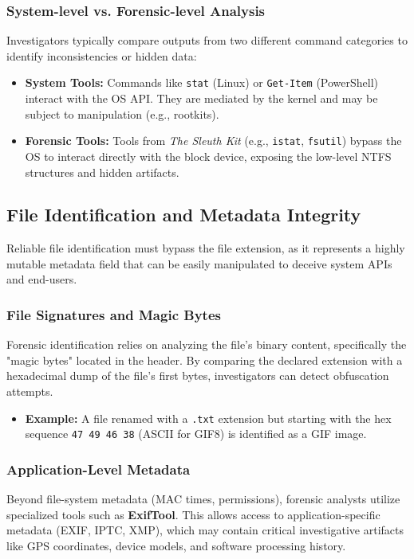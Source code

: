 \subsubsection*{System-level vs. Forensic-level Analysis}
Investigators typically compare outputs from two different command categories to identify inconsistencies or hidden data:
\begin{itemize}
    \item \textbf{System Tools:} Commands like \texttt{stat} (Linux) or \texttt{Get-Item} (PowerShell) interact with the OS API. They are mediated by the kernel and may be subject to manipulation (e.g., rootkits).
    \item \textbf{Forensic Tools:} Tools from \textit{The Sleuth Kit} (e.g., \texttt{istat}, \texttt{fsutil}) bypass the OS to interact directly with the block device, exposing the low-level NTFS structures and hidden artifacts.
\end{itemize}

\subsection{File Identification and Metadata Integrity}
Reliable file identification must bypass the file extension, as it represents a highly mutable metadata field that can be easily manipulated to deceive system APIs and end-users.

\subsubsection*{File Signatures and Magic Bytes}
Forensic identification relies on analyzing the file's binary content, specifically the "magic bytes" located in the header. By comparing the declared extension with a hexadecimal dump of the file's first bytes, investigators can detect obfuscation attempts.
\begin{itemize}
    \item \textbf{Example:} A file renamed with a \texttt{.txt} extension but starting with the hex sequence \texttt{47 49 46 38} (ASCII for GIF8) is identified as a GIF image.
\end{itemize}

\subsubsection*{Application-Level Metadata}
Beyond file-system metadata (MAC times, permissions), forensic analysts utilize specialized tools such as \textbf{ExifTool}. This allows access to application-specific metadata (EXIF, IPTC, XMP), which may contain critical investigative artifacts like GPS coordinates, device models, and software processing history.

